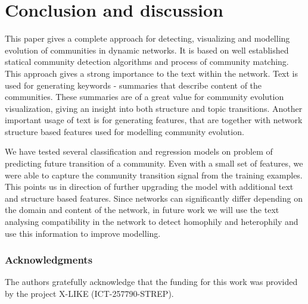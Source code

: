 \documentclass{article} %
\begin{document}
\section{Conclusion and discussion}
This paper gives a complete approach for detecting, visualizing and modelling evolution of communities in dynamic networks. It is based on well established statical community detection algorithms and process of community matching. This approach gives a strong importance to the text within the network. Text is used for generating keywords - summaries that describe content of the communities. These summaries are of a great value for community evolution visualization, giving an insight into both structure and topic transitions. Another important usage of text is for generating features, that are together with network structure based features used for modelling community evolution.

We have tested several classification and regression models on problem of predicting future transition of a community. Even with a small set of features, we were able to capture the community transition signal from the training examples. This points us in direction of further upgrading the model with additional text and structure based features. Since networks can significantly differ depending on the domain and content of the network, in future work we will use the text analysing compatibility in the network to detect homophily and heterophily and use this information to improve modelling. 

\subsubsection*{Acknowledgments}
   The authors gratefully acknowledge that the funding for this work was provided by the project X-LIKE (ICT-257790-STREP)\cite{xlike}.




\end{document}
